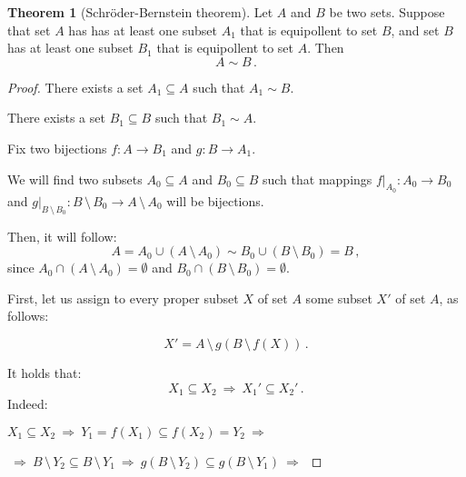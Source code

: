 \documentclass[11pt,paper=b5,footinclude,headinclude]{scrbook} %
\def\sledi {{~\Rightarrow~}}
\def\brez {{\,\setminus\,}}
\def\cee {{~\Leftrightarrow~}}
\theoremstyle{remark}
\theoremstyle{definition} %
\theoremstyle{theorem} %
\newtheorem*{theorem}{Theorem}
\begin{document}
\bigskip

\begin{theorem}[Schr\"oder-Bernstein theorem]
Let $A$ and $B$ be two sets.
Suppose that set $A$ has has at least one subset $A_1$ that is equipollent to set $B$, and
  set $B$ has at least one subset $B_1$ that is equipollent to set $A$.
Then  $$A\sim B\,.$$
\end{theorem}

\begin{proof}
There exists a set $A_1\subseteq A$ such that $A_1\sim B$.

There exists a set  $B_1\subseteq B$ such that  $B_1\sim A$.

Fix two bijections $f:A\to B_1$ and $g:B\to A_1$.

We will find two subsets $A_0\subseteq A$ and $B_0\subseteq B$ such that
mappings $f|_{A_0}:A_0\to B_0$ and
$g|_{B\brez B_0}:B\brez B_0\to A\brez A_0$ will be bijections.

Then, it will follow:
$$A = A_0\cup (A\brez A_0)\sim B_0\cup (B\brez B_0)= B\,,$$
since  $A_0\cap (A\brez A_0) = \emptyset$ and
 $B_0\cap (B\brez B_0) = \emptyset$.

 \medskip
First, let us assign to every proper subset $X$ of set $A$ some subset $X'$
of set $A$, as follows:

%
$$X' = A\brez g(B\brez f(X))\,.$$


It holds that:
$$X_1\subseteq X_2\sledi X_1'\subseteq X_2'\,.$$
Indeed:

$X_1\subseteq X_2 \sledi Y_1 = f(X_1)\subseteq f(X_2) = Y_2\sledi$

$\sledi B\brez Y_2\subseteq B\brez Y_1\sledi g(B\brez Y_2)\subseteq g(B\brez Y_1)\sledi$


\end{proof}
\end{document}
